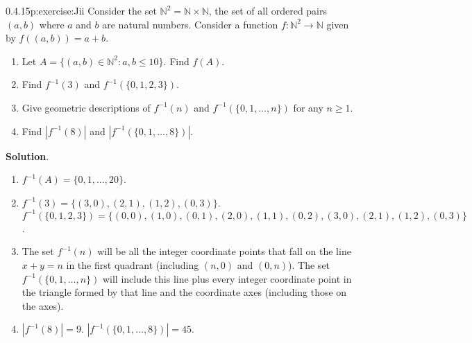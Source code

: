 \documentclass[twoside,11pt,]{book}
\newcommand{\blocktitlefont}{\relax}
\numberwithin{equation}{chapter}
\newcommand{\N}{\mathbb N}
\newcommand{\inv}{^{-1}}
\newcommand{\st}{:}
\newcommand{\card}[1]{\left| #1 \right|}
\begin{document}
\begin{divisionsolution}{0.4.15}{}{p:exercise:Jii}%
Consider the set \(\N^2 = \N \times \N\), the set of all ordered pairs \((a,b)\) where \(a\) and \(b\) are natural numbers. Consider a function \(f: \N^2 \to \N\) given by \(f((a,b)) =a+b\).%
\begin{enumerate}[label=(\alph*)]
\item{}Let \(A = \{(a,b) \in \N^2 \st a, b \le 10\}\). Find \(f(A)\).%
\item{}Find \(f\inv(3)\) and \(f\inv(\{0,1,2,3\})\).%
\item{}Give geometric descriptions of \(f\inv(n)\) and \(f\inv(\{0, 1, \ldots, n\})\) for any \(n \ge 1\).%
\item{}Find \(\card{f\inv(8)}\) and \(\card{f\inv(\{0,1, \ldots, 8\})}\).%
\end{enumerate}
%
\par\smallskip%
\noindent\textbf{\blocktitlefont Solution}.\quad{}%
\begin{enumerate}[label=(\alph*)]
\item{}\(f\inv(A) = \{0, 1, \ldots, 20\}\).%
\item{}\(f\inv(3) = \{(3,0), (2,1), (1,2), (0,3)\}\). \(f\inv(\{0,1,2,3\}) = \{(0,0), (1,0), (0,1), (2, 0), (1,1), (0, 2), (3,0), (2,1), (1,2), (0,3)\}\).%
\item{}The set \(f\inv(n)\) will be all the integer coordinate points that fall on the line \(x+y = n\) in the first quadrant (including \((n,0)\) and \((0,n)\)). The set \(f\inv(\{0, 1, \ldots,
n\})\) will include this line plus every integer coordinate point in the triangle formed by that line and the coordinate axes (including those on the axes).%
\item{}\(\card{f\inv(8)} = 9\). \(\card{f\inv(\{0, 1, \ldots, 8\})} = 45\).%
\end{enumerate}
%
\end{divisionsolution}%
\end{document}
